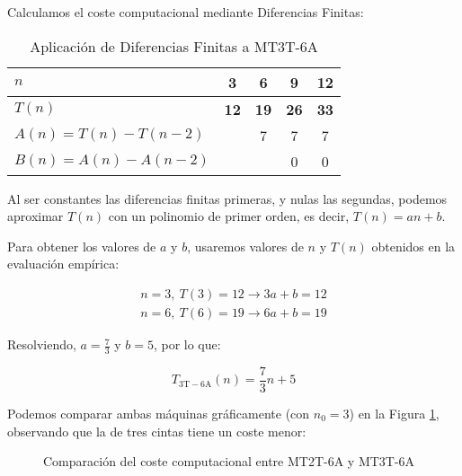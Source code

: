 Calculamos el coste computacional mediante Diferencias Finitas:

\begin{table}[H]
    \centering
    \begin{tabular}{|l|c|c|c|c|}
        \hline
        $n$    & \textbf{3}  & \textbf{6}  & \textbf{9}  & \textbf{12} \\ \hline
        $T(n)$ & \textbf{12} & \textbf{19} & \textbf{26} & \textbf{33} \\ \hline
        \hline
        $A(n) = T(n) - T(n-2)$ &   & 7 & 7 & 7 \\ \hline
        $B(n) = A(n) - A(n-2)$ &   &   & 0 & 0 \\ \hline
    \end{tabular}
    \caption{Aplicación de Diferencias Finitas a MT3T-6A}
\end{table}

Al ser constantes las diferencias finitas primeras, y nulas las segundas, podemos aproximar $T(n)$ con un polinomio de primer orden, es decir, $T(n) = an + b$.\medskip

Para obtener los valores de $a$ y $b$, usaremos valores de $n$ y $T(n)$ obtenidos en la evaluación empírica:

\begin{subequations}
    \begin{gather*}
        n = 3,\ T(3) = 12 \rightarrow 3a + b = 12 \\
        n = 6,\ T(6) = 19 \rightarrow 6a + b = 19
    \end{gather*}
\end{subequations}

Resolviendo, $a=\frac{7}{3}$ y $b=5$, por lo que:

\begin{equation}
    T_{\mathrm{3T-6A}}(n) = \frac{7}{3}n + 5
\end{equation}

Podemos comparar ambas máquinas gráficamente (con $n_0 = 3$) en la Figura \ref{fig:MT-6A}, observando que la de tres cintas tiene un coste menor:

\begin{figure}[H]
    \centering
    
    \caption{Comparación del coste computacional entre MT2T-6A y MT3T-6A}
    \label{fig:MT-6A}
\end{figure}




